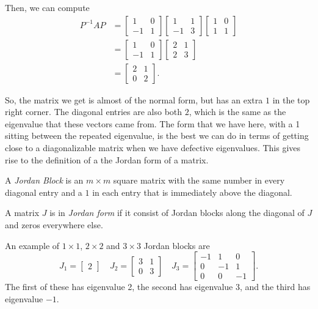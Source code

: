 \begin{exampleSol}
Then, we can compute 
\[ 
\begin{split}
P^{-1}AP &= \begin{bmatrix} 1 & 0 \\ -1 & 1 \end{bmatrix}\begin{bmatrix} 1 & 1 \\ -1 & 3 \end{bmatrix}\begin{bmatrix} 1 & 0 \\ 1 & 1 \end{bmatrix} \\
&= \begin{bmatrix} 1 & 0 \\ -1 & 1 \end{bmatrix}\begin{bmatrix} 2 & 1 \\ 2 & 3 \end{bmatrix} \\
&= \begin{bmatrix} 2 & 1 \\ 0 & 2 \end{bmatrix}.
\end{split}
\]
\end{exampleSol}

So, the matrix we get is almost of the normal form, but has an extra $1$ in the top right corner. The diagonal entries are also both $2$, which is the same as the eigenvalue that these vectors came from. The form that we have here, with a 1 sitting between the repeated eigenvalue, is the best we can do in terms of getting close to a diagonalizable matrix when we have defective eigenvalues. This gives rise to the definition of a the Jordan form of a matrix.

\begin{definition}
A \emph{Jordan Block} is an $m \times m$ square matrix with the same number in every diagonal entry and a $1$ in each entry that is immediately above the diagonal. 

A matrix $J$ is in \emph{Jordan form} if it consist of Jordan blocks along the diagonal of $J$ and zeros everywhere else.
\end{definition}

\begin{example}
An example of $1\times 1$, $2\times 2$ and $3\times 3$ Jordan blocks are
\[ J_1 = \begin{bmatrix} 2 \end{bmatrix} \quad J_2 = \begin{bmatrix} 3 & 1 \\ 0 & 3 \end{bmatrix} \quad J_3 = \begin{bmatrix} -1 & 1 & 0 \\ 0 & -1 & 1 \\ 0 & 0 & -1 \end{bmatrix}. \] The first of these has eigenvalue 2, the second has eigenvalue 3, and the third has eigenvalue $-1$. 
\end{example}

